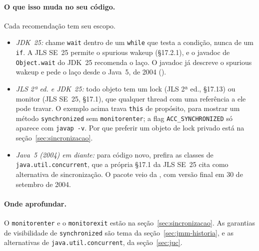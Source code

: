 \paragraph{O que isso muda no seu código.}
Cada recomendação tem seu escopo.
\begin{itemize}
\item \emph{JDK~25:} chame \texttt{wait} dentro de um \texttt{while}
  que testa a condição, nunca de um \texttt{if}. A JLS SE~25 permite o
  spurious wakeup (§17.2.1), e o javadoc de \texttt{Object.wait} do
  JDK~25 recomenda o laço. O javadoc já descreve o spurious wakeup e
  pede o laço desde o Java~5, de 2004 ().
\item \emph{JLS 2ª ed. e JDK~25:} todo objeto tem um lock (JLS 2ª
  ed., §17.13) ou monitor (JLS SE~25, §17.1), que qualquer thread com
  uma referência a ele pode travar. O exemplo acima trava \texttt{this}
  de propósito, para mostrar um método \texttt{synchronized} sem
  \texttt{monitorenter}; a flag \texttt{ACC\_SYNCHRONIZED} só aparece
  com \texttt{javap -v}. Por que preferir um objeto de lock privado está
  na seção~\ref{sec:sincronizacao}.
\item \emph{Java~5 (2004) em diante:} para código novo, prefira as
  classes de \texttt{java.util.concurrent}, que a própria §17.1 da JLS
  SE~25 cita como alternativa de sincronização. O pacote veio da
  , com versão final em 30 de setembro de 2004.
\end{itemize}

\paragraph{Onde aprofundar.}
O \texttt{monitorenter} e o \texttt{monitorexit} estão na
seção~\ref{sec:sincronizacao}. As garantias de visibilidade de
\texttt{synchronized} são tema da seção~\ref{sec:jmm-historia}, e as
alternativas de \texttt{java.util.concurrent}, da
seção~\ref{sec:juc}.
